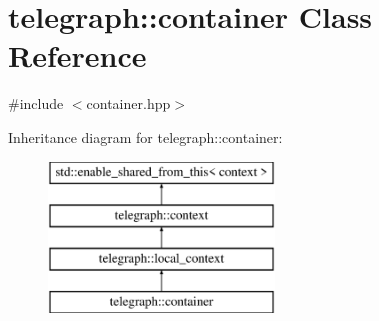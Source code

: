 \hypertarget{classtelegraph_1_1container}{}\section{telegraph\+:\+:container Class Reference}
\label{classtelegraph_1_1container}


{\ttfamily \#include $<$container.\+hpp$>$}

Inheritance diagram for telegraph\+:\+:container\+:\begin{figure}[H]
\begin{center}
\leavevmode
\includegraphics[height=4.000000cm]{classtelegraph_1_1container}
\end{center}
\end{figure}
